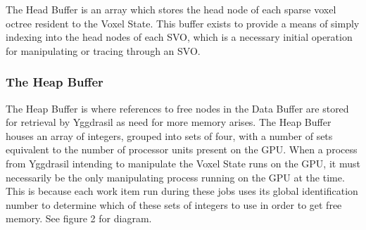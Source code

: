 \documentclass[onecolumn, draftclsnofoot,10pt, compsoc]{IEEEtran}
\begin{document}
The Head Buffer is an array which stores the head node of each sparse voxel octree resident to the Voxel State. This buffer exists to provide a means of simply indexing into the head nodes of each SVO, which is a necessary initial operation for manipulating or tracing through an SVO.\\


\subsubsection{The Heap Buffer}

The Heap Buffer is where references to free nodes in the Data Buffer are stored for retrieval by Yggdrasil as need for more memory arises. The Heap Buffer houses an array of integers, grouped into sets of four, with a number of sets equivalent to the number of processor units present on the GPU. When a process from Yggdrasil intending to manipulate the Voxel State runs on the GPU, it must necessarily be the only manipulating process running on the GPU at the time. This is because each work item run during these jobs uses its global identification number to determine which of these sets of integers to use in order to get free memory. See figure 2 for diagram.
\end{document}
